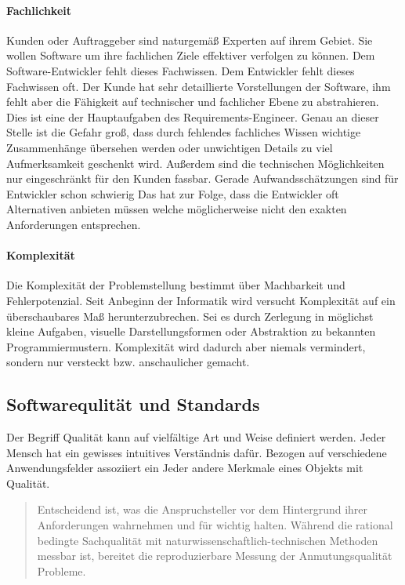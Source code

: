 \paragraph{Fachlichkeit}
Kunden oder Auftraggeber sind naturgemäß Experten auf ihrem Gebiet. Sie wollen Software um ihre fachlichen Ziele effektiver verfolgen zu können. Dem Software-Entwickler fehlt dieses Fachwissen. Dem Entwickler fehlt dieses Fachwissen oft.
Der Kunde hat sehr detaillierte Vorstellungen der Software, ihm fehlt aber die Fähigkeit auf technischer und fachlicher Ebene zu abstrahieren. Dies ist eine der Hauptaufgaben des Requirements-Engineer. Genau an dieser Stelle ist die Gefahr groß, dass durch fehlendes fachliches Wissen wichtige Zusammenhänge übersehen werden oder unwichtigen Details zu viel Aufmerksamkeit geschenkt wird.
Außerdem sind die technischen Möglichkeiten nur eingeschränkt für den Kunden fassbar. Gerade Aufwandsschätzungen sind für Entwickler schon schwierig Das hat zur Folge, dass die Entwickler oft Alternativen anbieten müssen welche möglicherweise nicht den exakten Anforderungen entsprechen.

\paragraph{Komplexität}
Die Komplexität der Problemstellung bestimmt über Machbarkeit und Fehlerpotenzial. Seit Anbeginn der Informatik wird versucht Komplexität auf ein überschaubares Maß herunterzubrechen. Sei es durch Zerlegung in möglichst kleine Aufgaben, visuelle Darstellungsformen oder Abstraktion zu bekannten Programmiermustern.
Komplexität wird dadurch aber niemals vermindert, sondern nur versteckt bzw. anschaulicher gemacht.


\subsection{Softwarequlität und Standards}
\label{sec:quality}
Der Begriff Qualität kann auf vielfältige Art und Weise definiert werden. Jeder Mensch hat ein gewisses intuitives Verständnis dafür. Bezogen auf verschiedene Anwendungsfelder assoziiert ein Jeder andere Merkmale eines Objekts mit Qualität.

\begin{quote}
Entscheidend ist, was die Anspruchsteller vor dem Hintergrund ihrer Anforderungen wahrnehmen und für wichtig halten. Während die rational bedingte Sachqualität mit naturwissenschaftlich-technischen Methoden messbar ist, bereitet die reproduzierbare Messung der Anmutungsqualität Probleme.\cite{markgraf_definition_2015}
\end{quote}

